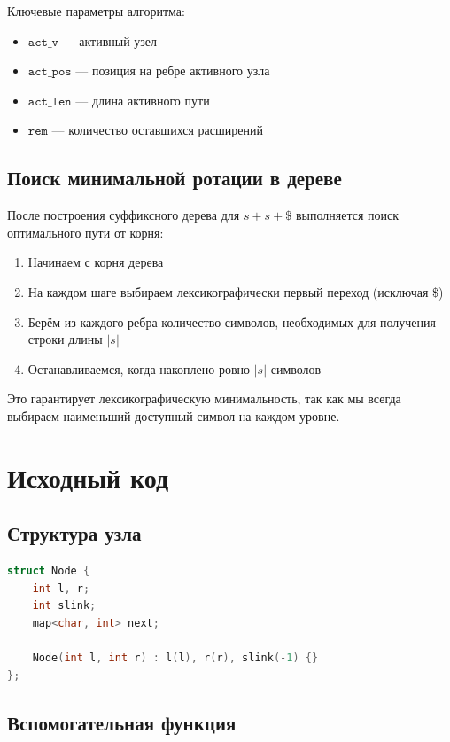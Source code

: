 Ключевые параметры алгоритма:
\begin{itemize}
    \item $\mathtt{act\_v}$ --- активный узел
    \item $\mathtt{act\_pos}$ --- позиция на ребре активного узла
    \item $\mathtt{act\_len}$ --- длина активного пути
    \item $\mathtt{rem}$ --- количество оставшихся расширений
\end{itemize}

\subsection{Поиск минимальной ротации в дереве}

После построения суффиксного дерева для $s + s + \$$ выполняется поиск оптимального пути от корня:

\begin{enumerate}
    \item Начинаем с корня дерева
    \item На каждом шаге выбираем лексикографически первый переход (исключая \$)
    \item Берём из каждого ребра количество символов, необходимых для получения строки длины $|s|$
    \item Останавливаемся, когда накоплено ровно $|s|$ символов
\end{enumerate}

Это гарантирует лексикографическую минимальность, так как мы всегда выбираем наименьший доступный символ на каждом уровне.

\pagebreak

\section{Исходный код}

\subsection{Структура узла}

\begin{lstlisting}[language=C++]
struct Node {
    int l, r;
    int slink;
    map<char, int> next;

    Node(int l, int r) : l(l), r(r), slink(-1) {}
};
\end{lstlisting}

\subsection{Вспомогательная функция}

